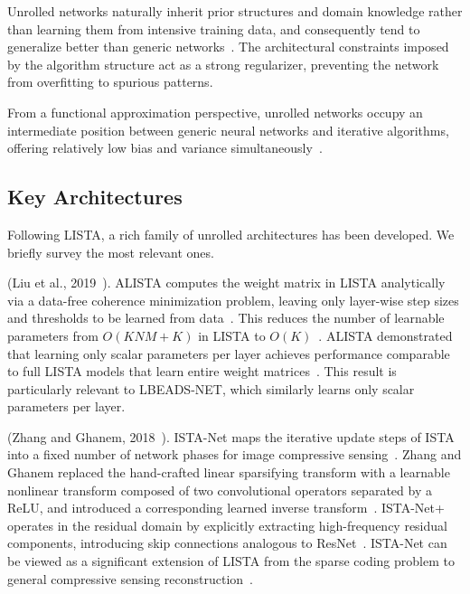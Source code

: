  Unrolled networks naturally inherit prior structures and domain knowledge rather than learning them from intensive training data, and consequently tend to generalize better than generic networks~\cite{monga2021unrolling}. The architectural constraints imposed by the algorithm structure act as a strong regularizer, preventing the network from overfitting to spurious patterns.

From a functional approximation perspective, unrolled networks occupy an intermediate position between generic neural networks and iterative algorithms, offering relatively low bias and variance simultaneously~\cite{monga2021unrolling}.

\subsection{Key Architectures}
\label{sec:bg_unrolling_architectures}

Following LISTA, a rich family of unrolled architectures has been developed. We briefly survey the most relevant ones.

 (Liu et al., 2019~\cite{liu2019alista}). ALISTA computes the weight matrix in LISTA analytically via a data-free coherence minimization problem, leaving only layer-wise step sizes and thresholds to be learned from data~\cite{liu2019alista}. This reduces the number of learnable parameters from $O(KNM + K)$ in LISTA to $O(K)$~\cite{liu2019alista}. ALISTA demonstrated that learning only scalar parameters per layer achieves performance comparable to full LISTA models that learn entire weight matrices~\cite{liu2019alista}. This result is particularly relevant to LBEADS-NET, which similarly learns only scalar parameters per layer.

 (Zhang and Ghanem, 2018~\cite{zhang2018istanet}). ISTA-Net maps the iterative update steps of ISTA into a fixed number of network phases for image compressive sensing~\cite{zhang2018istanet}. Zhang and Ghanem replaced the hand-crafted linear sparsifying transform with a learnable nonlinear transform composed of two convolutional operators separated by a ReLU, and introduced a corresponding learned inverse transform~\cite{zhang2018istanet}. ISTA-Net+ operates in the residual domain by explicitly extracting high-frequency residual components, introducing skip connections analogous to ResNet~\cite{zhang2018istanet}. ISTA-Net can be viewed as a significant extension of LISTA from the sparse coding problem to general compressive sensing reconstruction~\cite{zhang2018istanet}.


